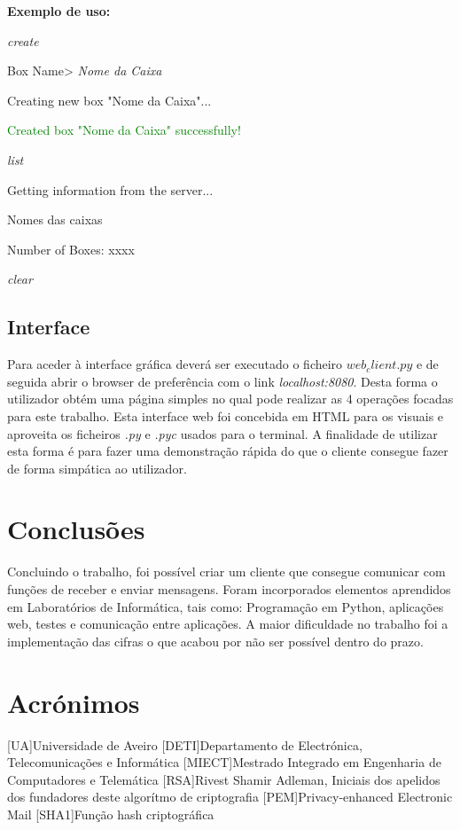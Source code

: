 \documentclass{report}
\begin{document}
\textbf{Exemplo de uso:} 


	\textit{create}	
	
	Box Name> \textit{Nome da Caixa}
	
	Creating new box "Nome da Caixa"...
	
	\textcolor{green}{Created box "Nome da Caixa" successfully!}
	
	\textit{list}	
	
	Getting information from the server...

	Nomes das caixas
	
	Number of Boxes: xxxx
	
	\textit{clear}
	

\section{Interface}
Para aceder à interface gráfica deverá ser executado o ficheiro \textit{$web_client.py$} 
e de seguida abrir o browser de preferência com o link \textit{localhost:8080}. 
Desta forma o utilizador obtém uma página simples no qual pode realizar as 4 operações focadas para este trabalho. 
Esta interface web foi concebida em HTML para os visuais e aproveita os ficheiros \textit{.py} e \textit{.pyc} usados para o terminal. 
A finalidade de utilizar esta forma é para fazer uma demonstração rápida do que o cliente consegue fazer de forma simpática ao utilizador.

\chapter{Conclusões}
\label{chap.conc}

Concluindo o trabalho, foi possível criar um cliente que consegue comunicar com funções de receber e enviar mensagens. Foram incorporados elementos aprendidos em Laboratórios de Informática, tais como: Programação em Python, aplicações web, testes e comunicação entre aplicações. A maior dificuldade no trabalho foi a implementação das cifras o que acabou por não ser possível dentro do prazo.


\chapter*{Acrónimos}
\begin{acronym}
 [UA]{Universidade de Aveiro}
 [DETI]{Departamento de Electrónica, Telecomunicações e Informática}
 [MIECT]{Mestrado Integrado em Engenharia de Computadores e Telemática}
 [RSA]{Rivest Shamir Adleman, Iniciais dos apelidos dos fundadores deste algorítmo de criptografia}
 [PEM]{Privacy-enhanced Electronic Mail}
 [SHA1]{Função hash criptográfica}
\end{acronym}


%
\end{document}
